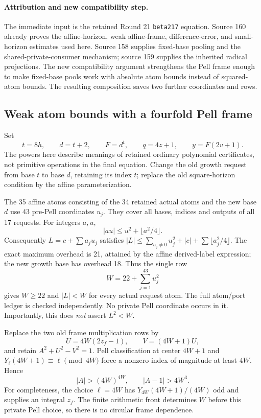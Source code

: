 \paragraph{Attribution and new compatibility step.}
The immediate input is the retained Round 21 \texttt{beta217} equation.
Source 160 already proves the affine-horizon, weak affine-frame,
difference-error, and small-horizon estimates used here.
Source 158 supplies fixed-base pooling and the shared-private-consumer
mechanism; source 159 supplies the inherited radical projections.
The new compatibility argument strengthens the Pell frame enough to make
fixed-base pools work with absolute atom bounds instead of squared-atom
bounds.  The resulting composition saves two further coordinates and rows.

\subsection*{Weak atom bounds with a fourfold Pell frame}
Set
\[
 t=8h,\qquad d=t+2,\qquad F=d^t,
 \qquad q=4z+1,\qquad y=F(2v+1).
\]
The powers here describe meanings of retained ordinary polynomial
certificates, not primitive operations in the final equation.
Change the old growth request from base $t$ to base $d$, retaining its index $t$;
replace the old square-horizon condition by the affine parameterization.

The 35 affine atoms consisting of the 34 retained actual atoms and the new base
$d$ use 43 pre-Pell coordinates $u_j$.  They cover all bases, indices and outputs
of all 17 requests.  For integers $a,u$,
\[
 |au|\le u^2+\lfloor a^2/4\rfloor.
\]
Consequently $L=c+\sum a_ju_j$ satisfies
$|L|\le\sum_{a_j\ne0}u_j^2+|c|+\sum\lfloor a_j^2/4\rfloor$.
The exact maximum overhead is 21, attained by the affine derived-label
expression; the new growth base has overhead 18.  Thus the single row
\[
 W=22+\sum_{j=1}^{43}u_j^2
 \tag{AF}
\]
gives $W\ge22$ and $|L|<W$ for every actual request atom.  The full atom/port
ledger is checked independently.  No private Pell coordinate occurs in it.
Importantly, this does \emph{not} assert $L^2<W$.

Replace the two old frame multiplication rows by
\[
 U=4W(2z_f-1),\qquad V=(4W+1)U,
\]
and retain $A^2+U^2-V^2=1$.  Pell classification at center $4W+1$ and
$Y_\ell(4W+1)\equiv\ell\pmod{4W}$ force a nonzero index of magnitude at least
$4W$.  Hence
\[
 |A|>(4W)^{4W},\qquad |A-1|>4W^3.\tag{PG}
\]
For completeness, the choice $\ell=4W$ has $Y_{4W}(4W+1)/(4W)$ odd and supplies
an integral $z_f$.  The finite arithmetic front determines $W$ before this
private Pell choice, so there is no circular frame dependence.

